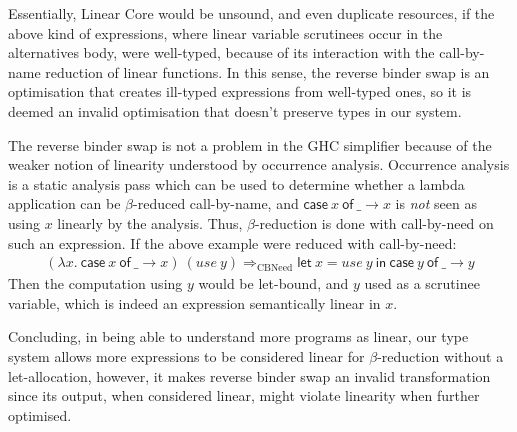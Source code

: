 \documentclass[acmsmall,review]{acmart}
\newcommand{\llet}[2]{\mathsf{let}~#1~\mathsf{in}~#2}
\newcommand{\ccase}[2]{\mathsf{case}~#1~\mathsf{of}~#2}
\begin{document}
Essentially, Linear Core would be unsound, and even duplicate resources, if the
above kind of expressions, where linear variable scrutinees occur in the
alternatives body, were well-typed, because of its interaction with the
call-by-name reduction of linear functions. In this sense, the reverse binder
swap is an optimisation that creates ill-typed expressions from well-typed
ones, so it is deemed an invalid optimisation that doesn't preserve types in
our system.

The reverse binder swap is not a problem in the GHC simplifier because of the
weaker notion of linearity understood by occurrence analysis. Occurrence
analysis is a static analysis pass which can be used to determine whether a
lambda application can be $\beta$-reduced call-by-name, and $\ccase{x}{\_ \to
x}$ is \emph{not} seen as using $x$ linearly by the analysis. Thus,
$\beta$-reduction is done with call-by-need on such an expression. If the above
example were reduced with call-by-need:
\[
\begin{array}{l}
(\lambda x.~\ccase{x}{\_ \to x})~(use~y)
\Longrightarrow_\textrm{CBNeed}
\llet{x = use~y}{\ccase{y}{\_ \to y}}
\end{array}
\]
Then the computation using $y$ would be let-bound, and $y$ used as a scrutinee
variable, which is indeed an expression semantically linear in $x$.

Concluding, in being able to understand more programs as linear, our type
system allows more expressions to be considered linear for $\beta$-reduction
without a let-allocation, however, it makes reverse binder swap an invalid
transformation since its output, when considered linear, might violate
linearity when further optimised.

% 
\end{document}
